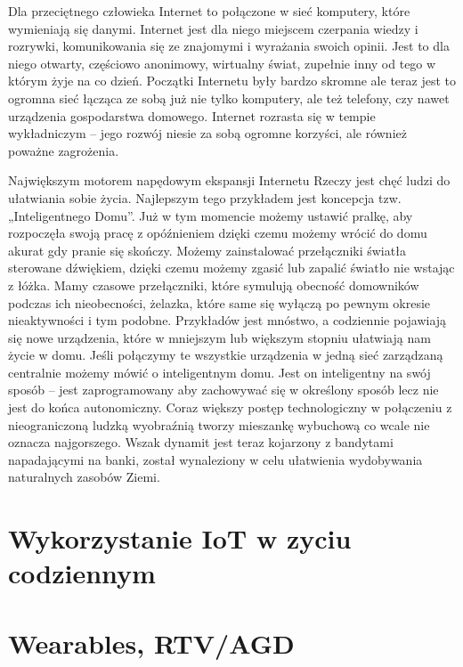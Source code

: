 \documentclass[brudnopis]{xmgr}
\begin{document}
Dla przeciętnego człowieka Internet to połączone w sieć komputery, które wymieniają się danymi. Internet jest dla niego miejscem czerpania wiedzy i rozrywki, komunikowania się ze znajomymi i wyrażania swoich opinii. Jest to dla niego otwarty, częściowo anonimowy, wirtualny świat, zupełnie inny od tego w którym żyje na co dzień. Początki Internetu były bardzo skromne ale teraz jest to ogromna sieć łącząca ze sobą już nie tylko komputery, ale też telefony, czy nawet urządzenia gospodarstwa domowego. Internet rozrasta się w tempie wykładniczym – jego rozwój niesie za sobą ogromne korzyści, ale również poważne zagrożenia.

Największym motorem napędowym ekspansji Internetu Rzeczy jest chęć ludzi do ułatwiania sobie życia. Najlepszym tego przykładem jest koncepcja tzw. „Inteligentnego Domu”. Już w tym momencie możemy ustawić pralkę, aby rozpoczęła swoją pracę z opóźnieniem dzięki czemu możemy wrócić do domu akurat gdy pranie się skończy. Możemy zainstalować przełączniki światła sterowane dźwiękiem, dzięki czemu możemy zgasić lub zapalić światło nie wstając z łóżka. Mamy czasowe przełączniki, które symulują obecność domowników podczas ich nieobecności, żelazka, które same się wyłączą po pewnym okresie nieaktywności i tym podobne. Przykładów jest mnóstwo, a codziennie pojawiają się nowe urządzenia, które w mniejszym lub większym stopniu ułatwiają nam życie w domu. Jeśli połączymy te wszystkie urządzenia w jedną sieć zarządzaną centralnie możemy mówić o inteligentnym domu. Jest on inteligentny na swój sposób – jest zaprogramowany aby zachowywać się w określony sposób lecz nie jest do końca autonomiczny. Coraz większy postęp technologiczny w połączeniu z nieograniczoną ludzką wyobraźnią tworzy mieszankę wybuchową co wcale nie oznacza najgorszego. Wszak dynamit jest teraz kojarzony z bandytami napadającymi na banki, został wynaleziony w celu ułatwienia wydobywania naturalnych zasobów Ziemi.

\section{Wykorzystanie IoT w zyciu codziennym}


\section{Wearables, RTV/AGD}
\end{document}
